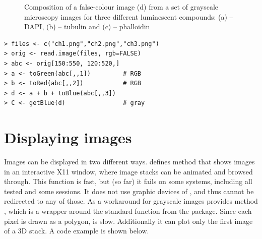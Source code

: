 \begin{figure}
\vspace*{.1in}
\begin{center}
\end{center}
\caption{\label{figure:channels}
    Composition of a false-colour image (d) from a set of grayscale microscopy images for three different luminescent compounds: (a) -- DAPI, (b) -- tubulin and (c) -- phalloidin
}
\end{figure}

\begin{verbatim}
> files <- c("ch1.png","ch2.png","ch3.png")
> orig <- read.image(files, rgb=FALSE)
> abc <- orig[150:550, 120:520,]
> a <- toGreen(abc[,,1])         # RGB
> b <- toRed(abc[,,2])           # RGB
> d <- a + b + toBlue(abc[,,3])
> C <- getBlue(d)                # gray
\end{verbatim}

\section*{Displaying images}

Images can be displayed in two different ways.  defines method  that shows images in an interactive X11 window, where image stacks can be animated and browsed through. This function is fast, but (so far) it fails on some systems, including all tested  and some  sessions. It does not use graphic devices of \R{}, and thus cannot be redirected to any of those. As a workaround for grayscale images  provides method , which is a wrapper around the standard function  from the  package. Since each pixel is drawn as a polygon,  is slow. Additionally it can plot only the first image of a 3D stack. A code example is shown below.


